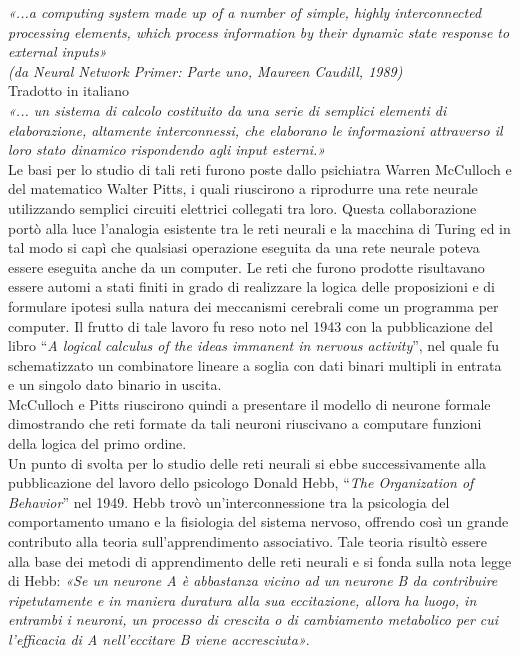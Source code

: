 \documentclass[12pt,a4paper,oneside]{book}
\begin{document}
		\textit{«...a computing system made up of a number of simple, highly interconnected processing elements, which process information by their dynamic state response to external inputs»}\\
		\textit{(da Neural Network Primer: Parte uno, Maureen Caudill, 1989)}\\
		
		Tradotto in italiano \\
		\textit{«... un sistema di calcolo costituito da una serie di semplici elementi di elaborazione, altamente interconnessi, che elaborano le informazioni attraverso il loro stato dinamico rispondendo agli input esterni.»}\\
		
		Le basi per lo studio di tali reti furono poste dallo psichiatra Warren McCulloch e del matematico Walter Pitts, i quali riuscirono a riprodurre una rete neurale utilizzando semplici circuiti elettrici collegati tra loro. Questa collaborazione portò alla luce l'analogia esistente tra le reti neurali e la macchina di Turing ed in tal modo si capì che qualsiasi operazione eseguita da una rete neurale poteva essere eseguita anche da un computer. Le reti che furono prodotte risultavano essere automi a stati finiti in grado di realizzare la logica delle proposizioni e di formulare ipotesi sulla natura dei meccanismi cerebrali come un programma per computer. Il frutto di tale lavoro fu reso noto nel 1943 con la pubblicazione del libro ``\emph{A logical calculus of the ideas immanent in nervous activity}'', nel quale fu schematizzato un combinatore lineare a soglia con dati binari multipli in entrata e un singolo dato binario in uscita.\\
	    McCulloch e Pitts riuscirono quindi a presentare il modello di neurone formale dimostrando che reti formate da tali neuroni riuscivano a computare funzioni della logica del primo ordine.\\
	    Un punto di svolta per lo studio delle reti neurali si ebbe successivamente alla pubblicazione del lavoro dello psicologo Donald Hebb, ``\emph{The Organization of Behavior}'' nel 1949. Hebb trovò un'interconnessione tra la psicologia del comportamento umano e la fisiologia del sistema nervoso, offrendo così un grande contributo alla teoria sull'apprendimento associativo. Tale teoria  risultò essere alla base dei metodi di apprendimento delle reti neurali e si fonda sulla nota legge di Hebb: \textit{«Se un neurone A è abbastanza vicino ad un neurone B da contribuire ripetutamente e in maniera duratura alla sua eccitazione, allora ha luogo, in entrambi i neuroni, un processo di crescita o di cambiamento metabolico per cui l'efficacia di A nell'eccitare B viene accresciuta»}.\\
\end{document}
